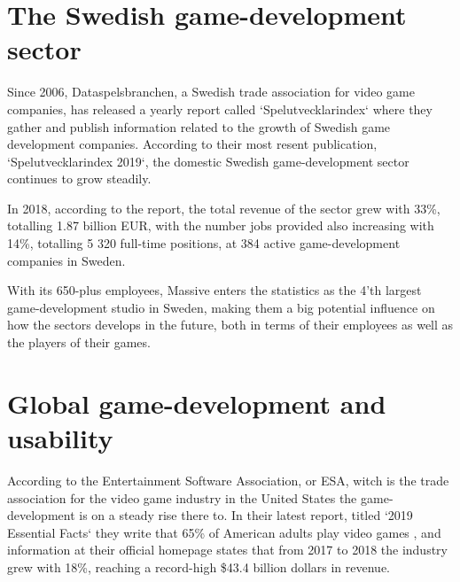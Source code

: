 \section{The Swedish game-development sector}

  Since 2006, Dataspelsbranchen, a Swedish trade association for video game
  companies\cite{citeDataspelsbranchen}, has released a yearly report called
  `Spelutvecklarindex` where they gather and publish information related to the
  growth of Swedish game development companies.
  According to their most resent publication,
  `Spelutvecklarindex 2019`\cite{citeIndex2019}, the domestic Swedish
  game-development sector continues to grow steadily.

  In 2018, according to the report, the total revenue of the sector grew with
  33\%, totalling 1.87 billion EUR, with the number jobs provided also increasing
  with 14\%, totalling 5 320\cite[p. 12]{citeIndex2019} full-time positions,
  at 384\cite[p. 38]{citeIndex2019} active game-development companies in Sweden.

  With its 650-plus employees, Massive enters the statistics as the 4'th
  largest game-development studio in Sweden\cite[p. 21]{citeIndex2019},
  making them a big potential influence on how the sectors develops in the
  future, both in terms of their employees as well as the players of their
  games.


\section{Global game-development and usability}


  According to the Entertainment Software Association, or ESA, witch is the trade
  association for the video game industry in the United States the game-development
  is on a steady rise there to. In their latest report, titled `2019 Essential Facts`%
  \cite{cite2019EssentialFactsAbouttheComputerandVideoGameIndustryEntertainmentSoftwareAssociation}
  they write that 65\% of American adults play video
  games\cite[p. 4]{cite2019EssentialFactsAbouttheComputerandVideoGameIndustryEntertainmentSoftwareAssociation}
  , and information at their official homepage states that from 2017 to 2018
  the industry grew with 18\%, reaching a record-high \$43.4 billion dollars in
  revenue\cite{eseaEconomicGrowth}.

